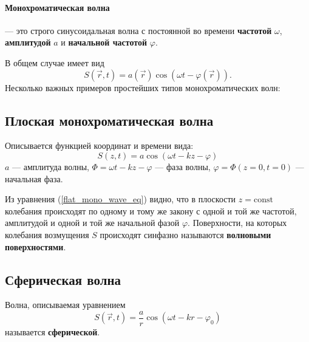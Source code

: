 \documentclass[a4paper, 12pt]{book}
\begin{document}
	\paragraph{Монохроматическая волна}— это строго синусоидальная волна с постоянной во времени \textbf{частотой} $\omega$, \textbf{амплитудой} $a$ и \textbf{начальной частотой} $\varphi$.\par
	В общем случае имеет вид
	\begin{equation}
		S\left(\vec{r}, t\right)=a\left(\vec{r}\right)\cos\left(\omega t-\varphi\left(\vec{r}\right)\right).
	\end{equation}
	Несколько важных примеров простейших типов монохроматических волн:
	\subsection{Плоская монохроматическая волна}
	Описывается функцией координат и времени вида:
	\begin{equation}
		S\left(z,t\right)=a\cos\left(\omega t-kz-\varphi\right)
		\label{flat_mono_wave_eq}
	\end{equation}
	$a$ — амплитуда волны, $\Phi=\omega t-kz-\varphi$ — фаза волны, $\varphi=\Phi\left(z=0,t=0\right)$ — начальная фаза.\par
	Из уравнения (\ref{flat_mono_wave_eq}) видно, что в плоскости $z=\mathrm{const}$ колебания происходят по одному и тому же закону с одной и той же частотой, амплитудой и одной и той же начальной фазой $\varphi$. Поверхности, на которых колебания возмущения $S$ происходят синфазно называются \textbf{волновыми поверхностями}.\par
	\subsection{Сферическая волна}
	Волна, описываемая уравнением
	\begin{equation}
		S\left(\vec{r},t\right)=\frac{a}{r}\cos\left(\omega t-kr-\varphi_0\right)
	\end{equation}
	называется \textbf{сферической}.
\end{document}

